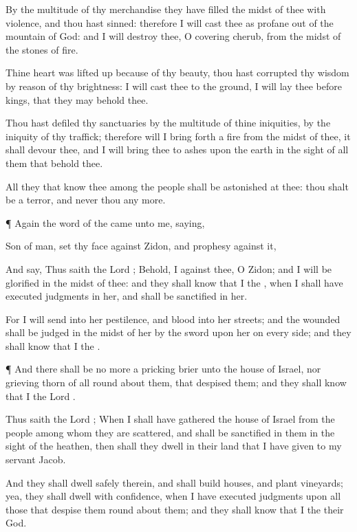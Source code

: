 {By the
multitude of thy
merchandise they have
filled the
midst of thee with
violence, and thou hast
sinned: therefore I will cast thee as
profane out of the
mountain of
God: and I will
destroy thee, O
covering
cherub, from the
midst of the
stones of
fire.

Thine
heart was lifted
up because of thy
beauty, thou hast
corrupted thy
wisdom by reason
of thy
brightness: I will
cast thee to the
ground, I will
lay thee
before
kings, that they may
behold thee.

Thou hast
defiled thy
sanctuaries by the
multitude of thine
iniquities, by the
iniquity of thy
traffick; therefore will I bring
forth a
fire from the
midst of thee, it shall
devour thee, and I will
bring thee to
ashes upon the
earth in the
sight of all them that
behold thee.

All they that
know thee among the
people shall be
astonished at thee: thou shalt be a
terror, and
never
{} thou
{} any
more.


\par }{\PP {}¶ Again the
word of the
{} came unto me,
saying,

Son of
man,
set thy
face against
Zidon, and
prophesy against it,

And
say, Thus
saith the
Lord
{}; Behold, I
{} against thee, O
Zidon; and I will be
glorified in the
midst of thee: and they shall
know that I
{} the
{}, when I shall have
executed
judgments in her, and shall be
sanctified in her.

For I will
send into her
pestilence, and
blood into her
streets; and the
wounded shall be
judged in the
midst of her by the
sword upon her on every
side; and they shall
know that I
{} the
{}.


\par }{\PP {}¶ And there shall be no more a
pricking
brier unto the
house of
Israel, nor
{}
grieving
thorn of all
{} round
about them, that
despised them; and they shall
know that I
{} the
Lord
{}.

Thus
saith the
Lord
{}; When I shall have
gathered the
house of
Israel from the
people among whom they are
scattered, and shall be
sanctified in them in the
sight of the
heathen, then shall they
dwell in their
land that I have
given to my
servant
Jacob.

And they shall
dwell
safely therein, and shall
build
houses, and
plant
vineyards; yea, they shall
dwell with
confidence, when I have
executed
judgments upon all those that
despise them round
about them; and they shall
know that I
{} the
{} their
God.




}
